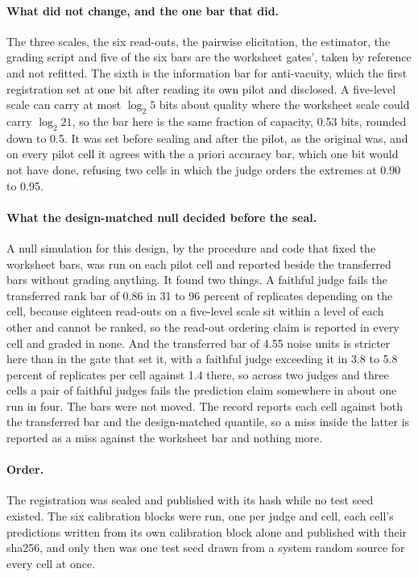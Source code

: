 \paragraph{What did not change, and the one bar that did.}
The three scales, the six read-outs, the pairwise elicitation, the estimator, the grading script and five of the six bars are the worksheet gates', taken by reference and not refitted. The sixth is the information bar for anti-vacuity, which the first registration set at one bit after reading its own pilot and disclosed. A five-level scale can carry at most $\log_2 5$ bits about quality where the worksheet scale could carry $\log_2 21$, so the bar here is the same fraction of capacity, 0.53 bits, rounded down to 0.5. It was set before sealing and after the pilot, as the original was, and on every pilot cell it agrees with the a priori accuracy bar, which one bit would not have done, refusing two cells in which the judge orders the extremes at 0.90 to 0.95.

\paragraph{What the design-matched null decided before the seal.}
A null simulation for this design, by the procedure and code that fixed the worksheet bars, was run on each pilot cell and reported beside the transferred bars without grading anything. It found two things. A faithful judge fails the transferred rank bar of 0.86 in 31 to 96 percent of replicates depending on the cell, because eighteen read-outs on a five-level scale sit within a level of each other and cannot be ranked, so the read-out ordering claim is reported in every cell and graded in none. And the transferred bar of 4.55 noise units is stricter here than in the gate that set it, with a faithful judge exceeding it in 3.8 to 5.8 percent of replicates per cell against 1.4 there, so across two judges and three cells a pair of faithful judges fails the prediction claim somewhere in about one run in four. The bars were not moved. The record reports each cell against both the transferred bar and the design-matched quantile, so a miss inside the latter is reported as a miss against the worksheet bar and nothing more.

\paragraph{Order.}
The registration was sealed and published with its hash while no test seed existed. The six calibration blocks were run, one per judge and cell, each cell's predictions written from its own calibration block alone and published with their sha256, and only then was one test seed drawn from a system random source for every cell at once.

